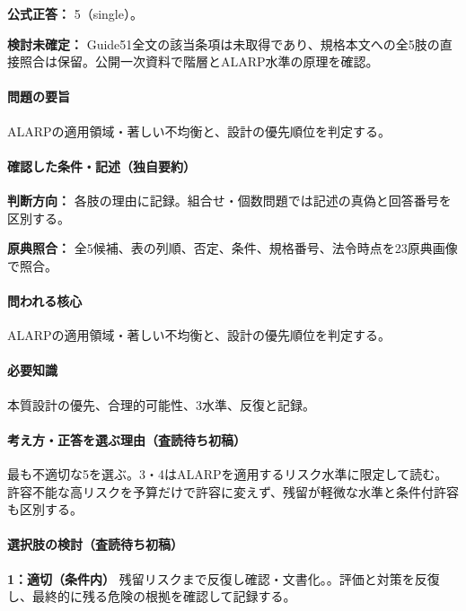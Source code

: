 \textbf{公式正答：} 5（single）。

\par\textbf{検討未確定：} Guide51全文の該当条項は未取得であり、規格本文への全5肢の直接照合は保留。公開一次資料で階層とALARP水準の原理を確認。

\paragraph{問題の要旨} ALARPの適用領域・著しい不均衡と、設計の優先順位を判定する。

\paragraph{確認した条件・記述（独自要約）}\mbox{}\par

\noindent\textbf{判断方向：} 各肢の理由に記録。組合せ・個数問題では記述の真偽と回答番号を区別する。\par

\noindent\textbf{原典照合：} 全5候補、表の列順、否定、条件、規格番号、法令時点を23原典画像で照合。\par

\paragraph{問われる核心} ALARPの適用領域・著しい不均衡と、設計の優先順位を判定する。

\paragraph{必要知識} 本質設計の優先、合理的可能性、3水準、反復と記録。

\paragraph{考え方・正答を選ぶ理由（査読待ち初稿）} 最も不適切な5を選ぶ。3・4はALARPを適用するリスク水準に限定して読む。許容不能な高リスクを予算だけで許容に変えず、残留が軽微な水準と条件付許容も区別する。

\paragraph{選択肢の検討（査読待ち初稿）}\mbox{}\par

\noindent\textbf{1：適切（条件内）} 残留リスクまで反復し確認・文書化。。評価と対策を反復し、最終的に残る危険の根拠を確認して記録する。\par

